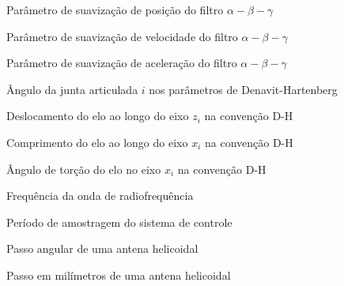 \documentclass[
	12pt,					%
	openright,				%
	oneside,					%
	a4paper,					%
	english,					%
	brazilian				%
	]{abntex2}
\begin{document}
\begin{simbolos}
  \item[$ \alpha $] Parâmetro de suavização de posição do filtro $\alpha-\beta-\gamma$
  \item[$ \beta $] Parâmetro de suavização de velocidade do filtro $\alpha-\beta-\gamma$
  \item[$ \gamma $] Parâmetro de suavização de aceleração do filtro $\alpha-\beta-\gamma$
  \item[$ \theta_i $] Ângulo da junta articulada $i$ nos parâmetros de Denavit-Hartenberg
  \item[$ d_i $] Deslocamento do elo ao longo do eixo $z_i$ na convenção D-H
  \item[$ a_i $] Comprimento do elo ao longo do eixo $x_i$ na convenção D-H
  \item[$ \alpha_i $] Ângulo de torção do elo no eixo $x_i$ na convenção D-H
  \item[$ f $] Frequência da onda de radiofrequência
  \item[$ T_s $] Período de amostragem do sistema de controle
  \item[$\epsilon$] Passo angular de uma antena helicoidal
  \item[$\rho$] Passo em milímetros de uma antena helicoidal

\end{simbolos}

\tableofcontents*
\cleardoublepage

\textual
\setcounter{page}{1}


% 




%
%

%
\end{document}
